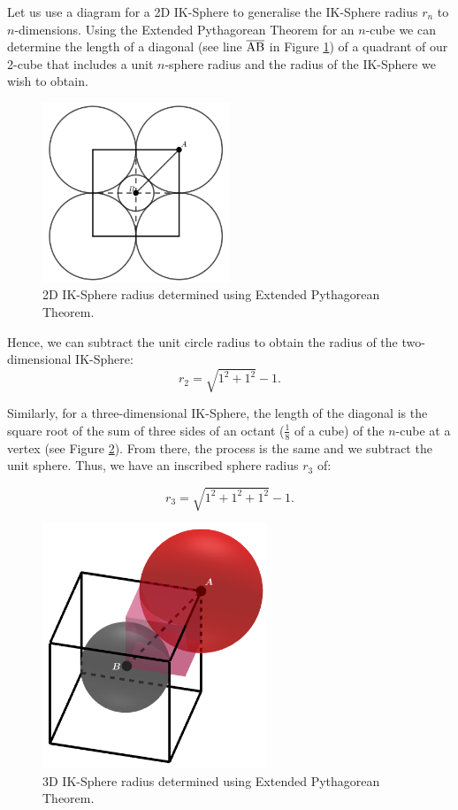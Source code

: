 Let us use a diagram for a 2D IK-Sphere to generalise the IK-Sphere radius $r_n$ to $n$-dimensions. Using the Extended Pythagorean Theorem for an $n$-cube we can determine the length of a diagonal (see line $\overline{\rm AB}$ in Figure \ref{fig:2d diagonal}) of a quadrant of our 2-cube that includes a unit $n$-sphere radius and the radius of the IK-Sphere we wish to obtain. 
\begin{figure}[h]
    \centering
    \includegraphics[width=0.5\textwidth]{images/diagonal 2d.png}
    \caption{\label{fig:2d diagonal}2D IK-Sphere radius determined using Extended Pythagorean Theorem.}
\end{figure}

\noindent Hence, we can subtract the unit circle radius to obtain the radius of the two-dimensional IK-Sphere: $$r_2 = \sqrt{1^2+1^2}-1.$$  %

Similarly, for a three-dimensional IK-Sphere, the length of the diagonal is the square root of the sum of three sides of an octant ($\frac{1}{8}$ of a cube) of the $n$-cube at a vertex (see Figure \ref{fig:3d diagonal}). From there, the process is the same and we subtract the unit sphere. Thus, we have an inscribed sphere radius $r_3$ of: 

\begin{equation*}
    r_3=\sqrt{1^2+1^2+1^2}-1.
\end{equation*}

\begin{figure}[H]
    \centering
    \includegraphics[width=0.6\textwidth]{images/3d diagonal.png}
    \caption{\label{fig:3d diagonal}3D IK-Sphere radius determined using Extended Pythagorean Theorem.}
\end{figure}


